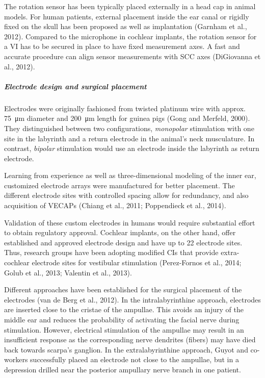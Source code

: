 The rotation sensor has been typically placed externally in a head cap in animal models. For human patients, external placement inside the ear canal or rigidly fixed on the skull has been proposed as well as implantation (Garnham et al., 2012). Compared to the microphone in cochlear implants, the rotation sensor for a VI has to be secured in place to have fixed measurement axes. A fast and accurate procedure can align sensor measurements with SCC axes (DiGiovanna et al., 2012).

\subparagraph{Electrode design and surgical placement}
Electrodes were originally fashioned from twisted platinum wire with approx. \SI{75}{\micro\metre} diameter and \SI{200}{\micro\metre} length for guinea pigs (Gong and Merfeld, 2000). They distinguished between two configurations, \emph{monopolar} stimulation with one site in the labyrinth and a return electrode in the animal's neck musculature. In contrast, \emph{bipolar} stimulation would use an electrode inside the labyrinth as return electrode. 

Learning from experience as well as three-dimensional modeling of the inner ear, customized electrode arrays were manufactured for better placement. The different electrode sites with controlled spacing allow for redundancy, and also acquisition of VECAPs (Chiang et al., 2011; Poppendieck et al., 2014).  

Validation of these custom electrodes in humans would require substantial effort to obtain regulatory approval. Cochlear implants, on the other hand, offer established and approved electrode design and have up to 22 electrode sites. Thus, research groups have been adopting modified CIs that provide extra-cochlear electrode sites for vestibular stimulation (Perez-Fornos et al., 2014; Golub et al., 2013; Valentin et al., 2013). 

Different approaches have been established for the surgical placement of the electrodes (van de Berg et al., 2012). In the intralabyrinthine approach, electrodes are inserted close to the cristae of the ampullae. This avoids an injury of the middle ear and reduces the probability of activating the facial nerve during stimulation. However, electrical stimulation of the ampullae may result in an insufficient response as the corresponding nerve dendrites (fibers) may have died back towards scarpa's ganglion. In the extralabyrinthine approach, Guyot and co-workers successfully placed an electrode not close to the ampullae, but in a depression drilled near the posterior ampullary nerve branch in one patient.  


